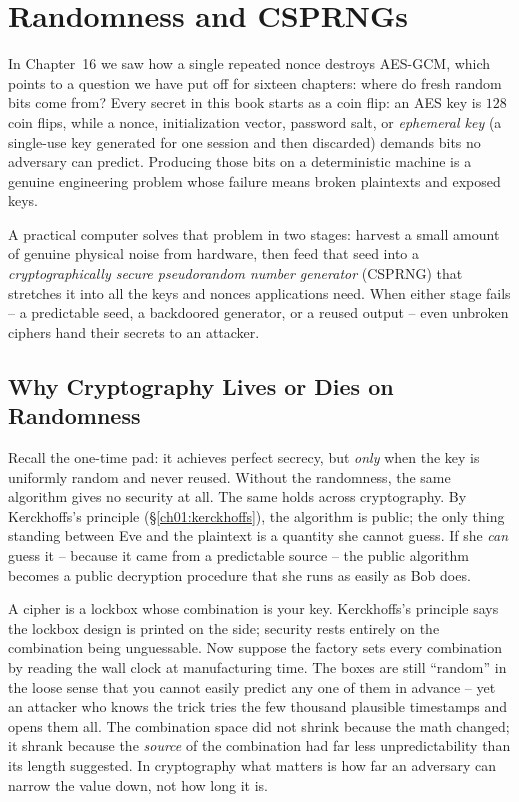 \chapter{Randomness and CSPRNGs}

In Chapter~16 we saw how a single repeated nonce destroys AES-GCM, which points to a question we have put off for sixteen chapters: where do fresh random bits come from? Every secret in this book starts as a coin flip: an AES key is $128$ coin flips, while a nonce, initialization vector, password salt, or \emph{ephemeral key} (a single-use key generated for one session and then discarded) demands bits no adversary can predict. Producing those bits on a deterministic machine is a genuine engineering problem whose failure means broken plaintexts and exposed keys.

A practical computer solves that problem in two stages: harvest a small amount of genuine physical noise from hardware, then feed that seed into a \emph{cryptographically secure pseudorandom number generator} (CSPRNG) that stretches it into all the keys and nonces applications need. When either stage fails -- a predictable seed, a backdoored generator, or a reused output -- even unbroken ciphers hand their secrets to an attacker.

\chapterline

\section{Why Cryptography Lives or Dies on Randomness}
\label{ch17:why-randomness}

Recall the one-time pad: it achieves perfect secrecy, but \emph{only} when the key is uniformly random and never reused. Without the randomness, the same algorithm gives no security at all. The same holds across cryptography. By Kerckhoffs's principle (\S\ref{ch01:kerckhoffs}), the algorithm is public; the only thing standing between Eve and the plaintext is a quantity she cannot guess. If she \emph{can} guess it -- because it came from a predictable source -- the public algorithm becomes a public decryption procedure that she runs as easily as Bob does.

\begin{intuitionbox}
A cipher is a lockbox whose combination is your key. Kerckhoffs's principle says the lockbox design is printed on the side; security rests entirely on the combination being unguessable. Now suppose the factory sets every combination by reading the wall clock at manufacturing time. The boxes are still ``random'' in the loose sense that you cannot easily predict any one of them in advance -- yet an attacker who knows the trick tries the few thousand plausible timestamps and opens them all. The combination space did not shrink because the math changed; it shrank because the \emph{source} of the combination had far less unpredictability than its length suggested. In cryptography what matters is how far an adversary can narrow the value down, not how long it is.
\end{intuitionbox}

